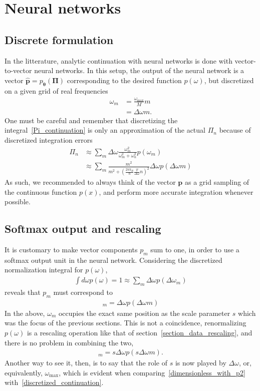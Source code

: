 \documentclass[notitlepage,11pt,nofootinbib]{revtex4-1}
\renewcommand{\vec}[1]{\bm{#1}}
\begin{document}
\section{Neural networks}

\subsection{Discrete formulation}
\label{section_discrete}

In the litterature, analytic continuation with neural networks is done with  vector-to-vector neural networks.\cite{Fournier2020,Xie2019,Yoon2018,Kades2019} In this setup, the output of the neural network is a vector $\hat{\vec p} = p_{\vec \theta}(\vec \Pi)$ corresponding to the desired function $p(\omega)$, but discretized on a given grid of real frequencies 
\begin{align}
\omega_m &= \frac{\omega_{\text{max}}}{M}m
\\
&=\Delta\omega m. 
\label{eq_discrete_grid}
\end{align}
One must be careful and remember that discretizing the integral~\eqref{Pi_continuation} is only an approximation of the actual $\Pi_n$ because of discretized integration errors
\begin{align}
\Pi_n
&\approx
\sum_{m}
\Delta\omega \frac{\omega_m^2}{\omega_m^2+\omega_n^2} p(\omega_m)
\\
&\approx
\sum_{m}
\frac{m^2}{m^2+(\frac{2\pi k_B}{\hbar}\frac{T}{\Delta\omega}n)^2} \Delta\omega p(\Delta\omega m)
\label{discretized_continuation}
\end{align}
As such, we recommended to always think of the vector $\vec p$ as a grid sampling of the continuous function $p(x)$, and perform more accurate integration whenever possible.

\subsection{Softmax output and rescaling}
It is customary to make vector components $p_m$ sum to one, in order to use a softmax output unit in the neural network. Considering the discretized normalization integral for $p(\omega)$,
\begin{align}
\int d\omega p(\omega) = 1 \approx \sum_m \Delta\omega p(\Delta\omega_m)
\end{align}
reveals that $p_m$ must correspond to
\begin{align}
    [\vec p]_m = \Delta\omega p(\Delta\omega m)
\end{align}
In the above, $\omega_m$ occupies the exact same position as the scale parameter $s$ which was the focus of the previous sections. This is not a coincidence, renormalizing $p(\omega)$ is a rescaling operation like that of section~\ref{section_data_rescaling}, and there is no problem in combining the two,
\begin{align}
    [\vec p_s]_m = s\Delta\omega p(s\Delta\omega m).
\end{align}
Another way to see it, then, is to say that the role of $s$ is now played by $\Delta\omega$, or, equivalently, $\omega_{\text{max}}$, which is evident when comparing~\eqref{dimensionless_with_p2} with~\eqref{discretized_continuation}.
\end{document}
